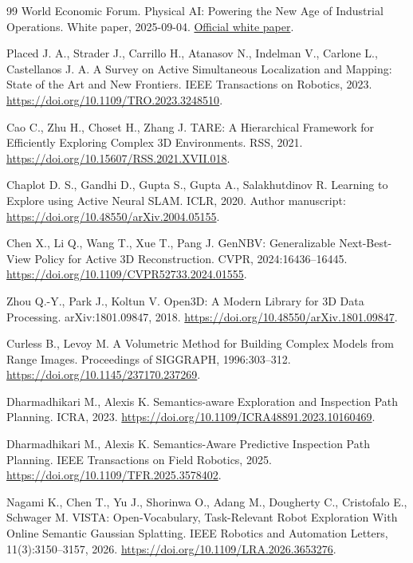 \begin{thebibliography}{99}
 World Economic Forum. Physical AI: Powering the New Age of Industrial Operations. White paper, 2025-09-04. \href{https://www.weforum.org/publications/physical-ai-powering-the-new-age-of-industrial-operations/}{Official white paper}.

 Placed J. A., Strader J., Carrillo H., Atanasov N., Indelman V., Carlone L., Castellanos J. A. A Survey on Active Simultaneous Localization and Mapping: State of the Art and New Frontiers. IEEE Transactions on Robotics, 2023. \url{https://doi.org/10.1109/TRO.2023.3248510}.

 Cao C., Zhu H., Choset H., Zhang J. TARE: A Hierarchical Framework for Efficiently Exploring Complex 3D Environments. RSS, 2021. \url{https://doi.org/10.15607/RSS.2021.XVII.018}.

 Chaplot D. S., Gandhi D., Gupta S., Gupta A., Salakhutdinov R. Learning to Explore using Active Neural SLAM. ICLR, 2020. Author manuscript: \url{https://doi.org/10.48550/arXiv.2004.05155}.

 Chen X., Li Q., Wang T., Xue T., Pang J. GenNBV: Generalizable Next-Best-View Policy for Active 3D Reconstruction. CVPR, 2024:16436--16445. \url{https://doi.org/10.1109/CVPR52733.2024.01555}.

 Zhou Q.-Y., Park J., Koltun V. Open3D: A Modern Library for 3D Data Processing. arXiv:1801.09847, 2018. \url{https://doi.org/10.48550/arXiv.1801.09847}.

 Curless B., Levoy M. A Volumetric Method for Building Complex Models from Range Images. Proceedings of SIGGRAPH, 1996:303--312. \url{https://doi.org/10.1145/237170.237269}.

 Dharmadhikari M., Alexis K. Semantics-aware Exploration and Inspection Path Planning. ICRA, 2023. \url{https://doi.org/10.1109/ICRA48891.2023.10160469}.

 Dharmadhikari M., Alexis K. Semantics-Aware Predictive Inspection Path Planning. IEEE Transactions on Field Robotics, 2025. \url{https://doi.org/10.1109/TFR.2025.3578402}.

 Nagami K., Chen T., Yu J., Shorinwa O., Adang M., Dougherty C., Cristofalo E., Schwager M. VISTA: Open-Vocabulary, Task-Relevant Robot Exploration With Online Semantic Gaussian Splatting. IEEE Robotics and Automation Letters, 11(3):3150--3157, 2026. \url{https://doi.org/10.1109/LRA.2026.3653276}.


\end{thebibliography}
